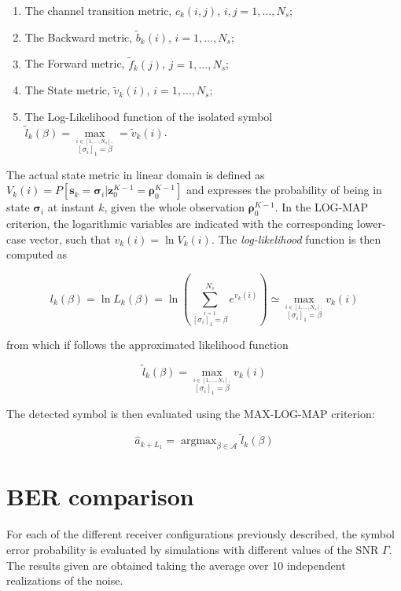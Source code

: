 \documentclass[a4paper, 12pt]{report}
\DeclareMathOperator*{\argmax}{argmax}
\begin{document}
\begin{enumerate}
	\item The channel transition metric, $c_k(i,j)$, $i,j=1,\dots,N_s$;
	\item The Backward metric, $\tilde{b}_k(i)$, $i=1,\dots,N_s$;
	\item The Forward metric, $\tilde{f}_k(j)$, $j=1,\dots,N_s$;
	\item The State metric, $\tilde{v}_k(i)$, $i=1,\dots,N_s$;
	\item The Log-Likelihood function of the isolated symbol $\tilde{l}_k(\beta)= \max\limits_{\overset{i\in[1,\dots,N_s],} {[\sigma_i]_1=\beta}}=\tilde{v}_k(i)$.
\end{enumerate}

The actual state metric in linear domain is defined as $V_k(i) = P[\mathbf{s}_k=\mathbf{\sigma}_i|\mathbf{z}^{K-1}_0=\mathbf{\rho}^{K-1}_0]$ and expresses the probability of being in state $\mathbf{\sigma}_i$ at instant $k$, given the whole observation $\mathbf{\rho}^{K-1}_0$. In the LOG-MAP criterion, the logarithmic variables are indicated with the corresponding lower-case vector, such that $v_k(i)=\ln V_k(i)$. The \textit{log-likelihood} function is then computed as

\begin{equation}
l_k(\beta) = \ln L_k(\beta) = \ln\left(\sum_{\overset{i=1}{[\sigma_i]_1=\beta}}^{N_s}e^{v_k(i)}\right)\simeq \max\limits_{\overset{i\in[1,\dots,N_s],} {[\sigma_i]_1=\beta}}v_k(i)
\end{equation}

from which if follows the approximated likelihood function

\begin{equation}
\tilde{l}_k(\beta) = \max\limits_{\overset{i\in[1,\dots,N_s],} {[\sigma_i]_1=\beta}}v_k(i)
\end{equation}

The detected symbol is then evaluated using the MAX-LOG-MAP criterion:

\begin{equation}
\hat{a}_{k+L_1} = \argmax_{\beta \in \mathcal{A}} \tilde{l}_k(\beta)
\end{equation}

\clearpage
\section*{BER comparison}
For each of the different receiver configurations previously described, the symbol error probability is evaluated by simulations with different values of the SNR $\Gamma$.\\
The results given are obtained taking the average over 10 independent realizations of the noise.
\end{document}
